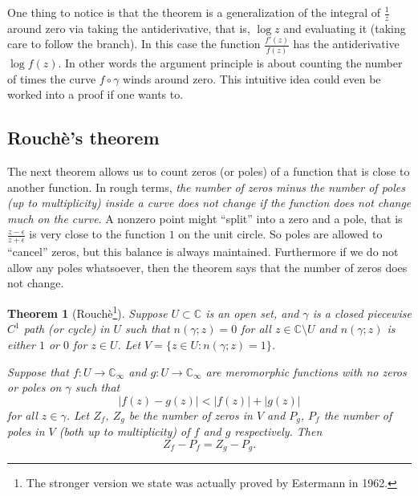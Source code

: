 \documentclass[12pt,openany]{book}
\newcommand{\sabs}[1]{\lvert {#1} \rvert}
\newcommand{\C}{{\mathbb{C}}}
\theoremstyle{plain}
\newtheorem{thm}{Theorem}[section]
\theoremstyle{remark}
\theoremstyle{definition}
\theoremstyle{exercise}
\theoremstyle{example}
\begin{document}
One thing to notice is that the theorem is a generalization of the integral
of $\frac{1}{z}$ around zero via taking the antiderivative, that is,
$\log z$ and evaluating it (taking care to follow the branch).  In this case
the function $\frac{f'(z)}{f(z)}$ has the antiderivative $\log f(z)$.
In other words the argument principle is about counting the number of times
the curve $f \circ \gamma$ winds around zero.
This intuitive idea could even be worked into a proof if one wants to.

\subsection{Rouch\`e's theorem}

The next theorem allows us to count zeros (or poles) of a function that is
close to another function.  In rough terms,
\emph{the number of zeros minus the
number of poles (up to multiplicity) inside a curve does not change
if the function does not change much on the curve}.
A nonzero point might ``split'' into a zero and a
pole, that is $\frac{z-\epsilon}{z+\epsilon}$ is very close to the function
$1$ on the unit circle.  So poles are allowed to ``cancel'' zeros, but this
balance is always maintained.  Furthermore if we do not allow any poles
whatsoever, then the theorem says that the number of zeros does not change.

\begin{thm}[Rouch\`e\footnote{%
The stronger version we state was actually proved by Estermann in 1962.}]\label{thm:rouche}
Suppose $U \subset \C$ is an open set, and $\gamma$ is a closed piecewise $C^1$
path (or cycle) in $U$ such that $n(\gamma;z) = 0$ for all $z \in \C \setminus U$
and $n(\gamma;z)$ is either $1$ or $0$ for $z \in U$.  Let $V = \{ z \in U
: n(\gamma;z) = 1 \}$.

Suppose that $f \colon U \to \C_\infty$ and $g \colon U \to \C_\infty$
are meromorphic functions with no zeros or poles on
$\gamma$ such that
\begin{equation*}
\sabs{f(z)-g(z)} < \sabs{f(z)}+\sabs{g(z)}
\end{equation*}
for all $z \in \gamma$.  Let $Z_f$, $Z_g$ be the number of zeros in $V$
and $P_g$, $P_f$ the number of poles in $V$ (both up to multiplicity)
of $f$ and $g$ respectively.
Then
\begin{equation*}
Z_f - P_f = 
Z_g - P_g.
\end{equation*}
\end{thm}
\end{document}
